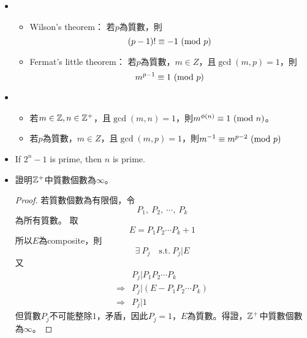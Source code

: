 \begin{itemize}
    \item \begin{itemize}
        \item Wilson's theorem：
        若$p$為質數，則
        \begin{equation}
            (p - 1)! \equiv -1 \ (\mathrm{mod}\ p)
        \end{equation}
        \item Fermat's little theorem：
        若$p$為質數，$m \in Z$，且$\gcd(m, p) = 1$，則
        \begin{equation}
            m^{p - 1} \equiv 1 \ (\mathrm{mod}\ p)
        \end{equation}
    \end{itemize}
    \item \begin{itemize}
        \item 若$m \in \mathbb{Z}, n \in \mathbb{Z}^+$，且$\gcd(m, n) = 1$，則$m^{\phi(n)} \equiv 1 \ (\mathrm{mod}\ n)$。
        \item 若$p$為質數，$m \in Z$，且$\gcd(m, p) = 1$，則$m^{-1} \equiv m^{p - 2} \ (\mathrm{mod}\ p)$
    \end{itemize}
    \item If $2^n - 1$ is prime, then $n$ is prime.
    \item 證明$\mathbb{Z}^+$中質數個數為$\infty$。 \\
    \begin{proof}
        若質數個數為有限個，令\begin{equation}
            P_1, \ P_2, \ \cdots, \ P_k
        \end{equation} 為所有質數。
        取\begin{equation}
            E = P_1P_2\cdots P_k + 1
        \end{equation} 所以$E$為composite，則
        \begin{equation}
            \exists \ P_j \quad \text{s.t.} \ P_j | E
        \end{equation} 又
        \begin{equation}
            \begin{aligned}
                & P_j | P_1P_2\cdots P_k  \\
                \Rightarrow & P_j | (E - P_1P_2\cdots P_k) \\
                \Rightarrow & P_j | 1
            \end{aligned} 
        \end{equation} 但質數$P_j$不可能整除$1$，矛盾，因此$P_j = 1$，$E$為質數。得證，$\mathbb{Z}^+$中質數個數為$\infty$。
    \end{proof}

\end{itemize}
